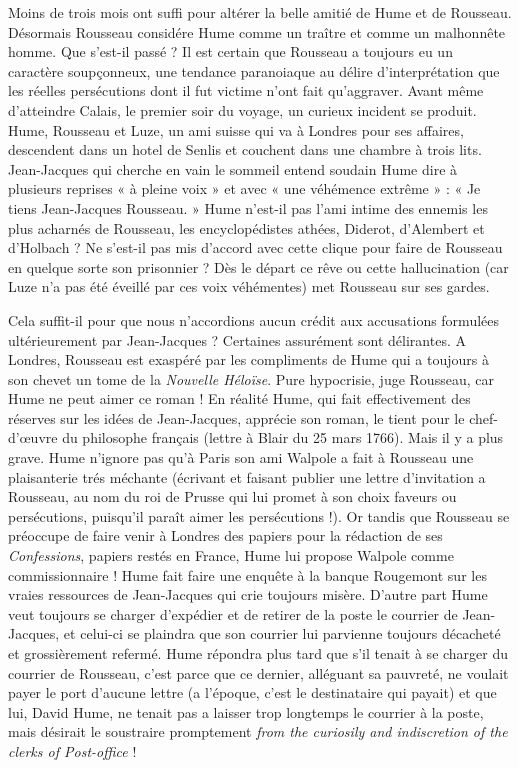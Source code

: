 Moins de trois mois ont suffi pour altérer la belle
amitié de Hume et de Rousseau. Désormais Rousseau
considére Hume comme un traître et comme un
malhonnête homme. Que s’est-il passé ? Il est certain
que Rousseau a toujours eu un caractère soupçonneux,
une tendance paranoiaque au délire d’interprétation
que les réelles persécutions dont il fut
victime n’ont fait qu’aggraver. Avant même d’atteindre Calais,
le premier soir du voyage, un curieux
incident se produit. Hume, Rousseau et Luze, un
ami suisse qui va à Londres pour ses affaires, descendent
dans un hotel de Senlis et couchent dans une
chambre à trois lits. Jean-Jacques qui cherche en
vain le sommeil entend soudain Hume dire à plusieurs
reprises « à pleine voix » et avec « une véhémence extrême » :
« Je tiens Jean-Jacques Rousseau. »
Hume n’est-il pas l’ami intime des ennemis les plus
acharnés de Rousseau, les encyclopédistes athées,
Diderot, d’Alembert et d’Holbach ? Ne s’est-il
pas mis d’accord avec cette clique pour faire de
Rousseau en quelque sorte son prisonnier ? Dès le
départ ce rêve ou cette hallucination (car Luze
n’a pas été éveillé par ces voix véhémentes) met
Rousseau sur ses gardes.

Cela suffit-il pour que nous n’accordions aucun
crédit aux accusations formulées ultérieurement par
Jean-Jacques ? Certaines assurément sont délirantes.
A Londres, Rousseau est exaspéré par les
compliments de Hume qui a toujours à son chevet
un tome de la {\it Nouvelle Héloïse}. Pure hypocrisie,
juge Rousseau, car Hume ne peut aimer ce roman !
En réalité Hume, qui fait effectivement des réserves
sur les idées de Jean-Jacques, apprécie son roman,
le tient pour le chef-d’{\oe}uvre du philosophe français
(lettre à Blair du 25 mars 1766). Mais il y a plus
grave. Hume n’ignore pas qu’à Paris son ami Walpole
a fait à Rousseau une plaisanterie trés méchante
(écrivant et faisant publier une lettre d’invitation a
Rousseau, au nom du roi de Prusse qui lui promet à
son choix faveurs ou persécutions, puisqu’il paraît
aimer les persécutions !). Or tandis que Rousseau se
préoccupe de faire venir à Londres des papiers pour
la rédaction de ses {\it Confessions}, papiers restés en
France, Hume lui propose Walpole comme commissionnaire !
Hume fait faire une enquête à la banque
Rougemont sur les vraies ressources de Jean-Jacques
qui crie toujours misère. D’autre part Hume veut
toujours se charger d’expédier et de retirer de la
poste le courrier de Jean-Jacques, et celui-ci se
plaindra que son courrier lui parvienne toujours
décacheté et grossièrement refermé. Hume répondra
plus tard que s’il tenait à se charger du courrier de
Rousseau, c’est parce que ce dernier, alléguant sa
pauvreté, ne voulait payer le port d’aucune lettre
(a l’époque, c’est le destinataire qui payait) et que
lui, David Hume, ne tenait pas a laisser trop longtemps
le courrier à la poste, mais désirait le soustraire
promptement {\it from the curiosily and indiscretion
of the clerks of Post-office} !

